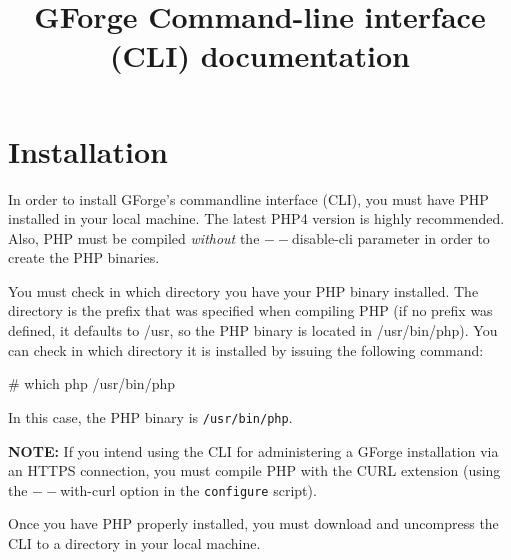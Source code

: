 \documentclass[a4]{article}
\begin{document}
\title{GForge Command-line interface (CLI) documentation}
\author{}
\date{}
\maketitle

\section{Installation}

In order to install GForge's commandline interface (CLI), you must have PHP
installed in your local machine. The latest PHP4 version is highly recommended.
Also, PHP must be compiled \emph{without} the $--$disable-cli parameter in order to create the
PHP binaries.

You must check in which directory you have your PHP binary installed. The directory
is the prefix that was specified when compiling PHP (if no prefix was defined, it
defaults to /usr, so the PHP binary is located in /usr/bin/php). You can check in which
directory it is installed by issuing the following command:

\begin{console}
# which php
/usr/bin/php
\end{console}

In this case, the PHP binary is \verb|/usr/bin/php|.

\textbf{NOTE:} If you intend using the CLI for administering a GForge installation via an
HTTPS connection, you must compile PHP with the CURL extension (using the $--$with-curl
option in the \verb|configure| script).

Once you have PHP properly installed, you must download and uncompress the CLI
to a directory in your local machine.
\end{document}
